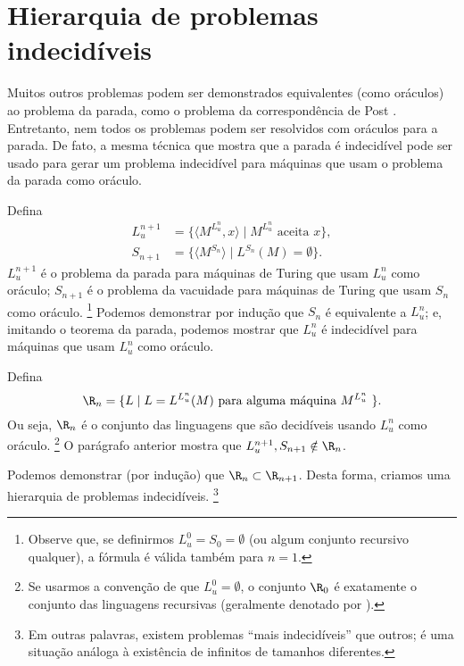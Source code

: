 \section{Hierarquia de problemas indecidíveis}

Muitos outros problemas podem ser demonstrados equivalentes
(como oráculos)
ao problema da parada,
como o problema da correspondência de Post \cite[p.~214]{HopcroftUllman1979}.
Entretanto,
nem todos os problemas podem ser resolvidos com oráculos para a parada.
De fato, a mesma técnica que mostra que a parada é indecidível
pode ser usado para gerar um problema indecidível
para máquinas que usam o problema da parada como oráculo.

Defina
\begin{align*}
    L_u^{n+1} &= \{ \langle M^{L_u^n}, x \rangle \mid M^{L_u^n} \text{ aceita } x \}, \\
    S_{n+1} &= \{ \langle M^{S_n} \rangle \mid L^{S_n}(M) = \emptyset \}.
\end{align*}
$L_u^{n+1}$ é o problema da parada
para máquinas de Turing que usam $L_u^n$ como oráculo;
$S_{n+1}$ é o problema da vacuidade
para máquinas de Turing que usam $S_n$ como oráculo.%
\footnote{
    Observe que,
    se definirmos $L_u^0 = S_0 = \emptyset$
    (ou algum conjunto recursivo qualquer),
    a fórmula é válida também para $n = 1$.
}
Podemos demonstrar por indução que $S_n$ é equivalente a $L_u^n$;
e, imitando o teorema da parada,
podemos mostrar que $L_u^n$ é indecidível para máquinas que usam $L_u^n$ como oráculo.

Defina
\begin{equation*}
    \R_n = \{ L \mid L = L^{L_u^n}(M) \text{ para alguma máquina $M^{L_u^n}$ } \}.
\end{equation*}
Ou seja, $\R_n$ é o conjunto das linguagens
que são decidíveis usando $L_u^n$ como oráculo.%
\footnote{
    Se usarmos a convenção de que $L_u^0 = \emptyset$,
    o conjunto $\R_0$ é exatamente o conjunto das linguagens recursivas
    (geralmente denotado por \R).
}
O parágrafo anterior mostra que $L_u^{n+1}, S_{n+1} \notin \R_n$.

Podemos demonstrar (por indução) que $\R_n \subset \R_{n+1}$.
Desta forma,
criamos uma hierarquia de problemas indecidíveis.%
\footnote{
    Em outras palavras,
    existem problemas ``mais indecidíveis'' que outros;
    é uma situação análoga à existência de infinitos de tamanhos diferentes.
}

